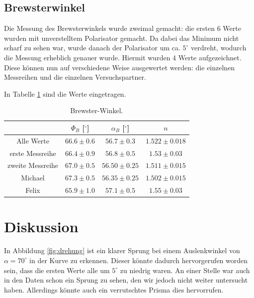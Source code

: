\documentclass[12pt,a4paper,titlepage,headinclude,bibtotoc]{scrartcl}
\begin{document}
\subsection{Brewsterwinkel}
Die Messung des Brewsterwinkels wurde zweimal gemacht: die ersten 6 Werte wurden mit unverstelltem Polarisator gemacht.
Da dabei das Minimum nicht scharf zu sehen war, wurde danach der Polarisator um ca. $5^\circ$ verdreht, wodurch die Messung erheblich genauer wurde.
Hiermit wurden 4 Werte aufgezeichnet.
Diese können nun auf verschiedene Weise ausgewertet werden: die einzelnen Messreihen und die einzelnen Versuchspartner.

In Tabelle \ref{tab:brewster} sind die Werte eingetragen.

\begin{table}[!htb]
\centering
\begin{tabular}{|c|c|c|c|}
         \hline
         & $\Phi_B$ [$^\circ$] & $\alpha_B$ [$^\circ$] & $n$ \\
         \hline
         Alle Werte & $66.6 \pm 0.6$ & $56.7 \pm 0.3$ & $1.522 \pm 0.018$ \\
         erste Messreihe & $66.4 \pm 0.9$ & $56.8 \pm 0.5$ & $1.53 \pm 0.03$ \\
         zweite Messreihe & $67.0 \pm 0.5$ & $56.50 \pm 0.25$ & $1.511 \pm 0.015$ \\
         \hline
         Michael & $67.3 \pm 0.5$ & $56.35 \pm 0.25$ & $1.502 \pm 0.015$ \\
         Felix & $65.9 \pm 1.0$ & $57.1 \pm 0.5$ & $1.55 \pm 0.03$ \\
         \hline
\end{tabular}
\caption{Brewster-Winkel.}
\label{tab:brewster}
\end{table}



\section{Diskussion}
\label{sec:diskussion}
In Abbildung \ref{fig:drehung} ist ein klarer Sprung bei einem Auslenkwinkel von $\alpha=70^\circ$ in der Kurve zu erkennen.
Dieser könnte dadurch hervorgerufen worden sein, dass die ersten Werte alle um $5^\circ$ zu niedrig waren.
An einer Stelle war auch in den Daten schon ein Sprung zu sehen, den wir jedoch nicht weiter untersucht haben.
Allerdings könnte auch ein verrutschtes Prisma dies hervorrufen.





 
 
\end{document}
